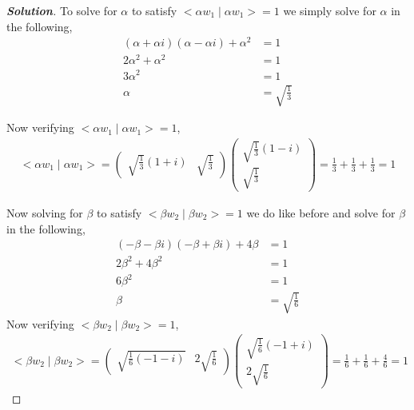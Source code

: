 \documentclass[11pt]{article}
\newenvironment{solution}{\begin{proof}[\textbf{\textit{Solution}}] }{\end{proof}}
\begin{document}
\begin{solution}
            To solve for $\alpha$ to satisfy $<\alpha w_1 \mid \alpha w_1> = 1$ we simply solve for $\alpha$ in the following,
            \begin{align*}
                (\alpha+\alpha i)(\alpha - \alpha i) + \alpha^{2} &= 1 \\
                2\alpha^{2} + \alpha^{2} &= 1 \\
                3\alpha^{2} &= 1 \\
                \alpha &= \sqrt{\frac{1}{3}}
            \end{align*}

            Now verifying $<\alpha w_1 \mid \alpha w_1> = 1$,
            \begin{align*}
                <\alpha w_1 \mid \alpha w_1> = \begin{pmatrix}
                    \sqrt{\frac{1}{3}}(1+i) & \sqrt{\frac{1}{3}}
                \end{pmatrix} \begin{pmatrix}
                    \sqrt{\frac{1}{3}}(1-i) \\ \sqrt{\frac{1}{3}}
                \end{pmatrix} = \frac{1}{3} + \frac{1}{3} + \frac{1}{3} = 1
            \end{align*}

            Now solving for $\beta$ to satisfy $<\beta w_2 \mid \beta w_2> = 1$ we do like before and solve for $\beta$ in the following,
            \begin{align*}
                (-\beta -\beta i)(-\beta + \beta i) + 4\beta &= 1 \\
                2\beta^{2} + 4\beta^{2} &= 1 \\
                6\beta^{2} &= 1 \\
                \beta &=\sqrt{\frac{1}{6}} 
            \end{align*}
            Now verifying $<\beta w_2 \mid \beta w_2> = 1$,
            \begin{align*}
                <\beta w_2 \mid \beta w_2> = \begin{pmatrix}
                    \sqrt{\frac{1}{6}(-1 - i)} & 2\sqrt{\frac{1}{6}} 
                \end{pmatrix}
                \begin{pmatrix}
                    \sqrt{\frac{1}{6}}(-1 + i) \\ 2\sqrt{\frac{1}{6}} 
                \end{pmatrix}
                = \frac{1}{6} + \frac{1}{6} + \frac{4}{6} = 1
            \end{align*}


\end{solution}
\end{document}
